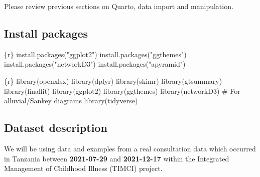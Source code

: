 \documentclass[
  letterpaper,
  DIV=11,
  numbers=noendperiod,
  oneside]{scrreprt}
\newenvironment{Shaded}{\begin{snugshade}}{\end{snugshade}}
\newcommand{\CommentTok}[1]{\textcolor[rgb]{0.37,0.37,0.37}{#1}}
\newcommand{\FunctionTok}[1]{\textcolor[rgb]{0.28,0.35,0.67}{#1}}
\newcommand{\InformationTok}[1]{\textcolor[rgb]{0.37,0.37,0.37}{#1}}
\newcommand{\NormalTok}[1]{\textcolor[rgb]{0.00,0.23,0.31}{#1}}
\newcommand{\StringTok}[1]{\textcolor[rgb]{0.13,0.47,0.30}{#1}}
\begin{document}
Please review previous sections on Quarto, data import and manipulation.

\hypertarget{install-packages}{%
\subsection{Install packages}\label{install-packages}}

\begin{Shaded}
\begin{Highlighting}[]
\InformationTok{\textasciigrave{}\textasciigrave{}\textasciigrave{}\{r\}}
\FunctionTok{install.packages}\NormalTok{(}\StringTok{"ggplot2"}\NormalTok{)}
\FunctionTok{install.packages}\NormalTok{(}\StringTok{"ggthemes"}\NormalTok{)}
\FunctionTok{install.packages}\NormalTok{(}\StringTok{"networkD3"}\NormalTok{)}
\FunctionTok{install.packages}\NormalTok{(}\StringTok{"apyramid"}\NormalTok{)}
\InformationTok{\textasciigrave{}\textasciigrave{}\textasciigrave{}}
\end{Highlighting}
\end{Shaded}

\begin{Shaded}
\begin{Highlighting}[]
\InformationTok{\textasciigrave{}\textasciigrave{}\textasciigrave{}\{r\}}
\FunctionTok{library}\NormalTok{(openxlsx)}
\FunctionTok{library}\NormalTok{(dplyr)}
\FunctionTok{library}\NormalTok{(skimr)}
\FunctionTok{library}\NormalTok{(gtsummary)}
\FunctionTok{library}\NormalTok{(finalfit)}
\FunctionTok{library}\NormalTok{(ggplot2)}
\FunctionTok{library}\NormalTok{(ggthemes)}
\FunctionTok{library}\NormalTok{(networkD3) }\CommentTok{\# For alluvial/Sankey diagrams}
\FunctionTok{library}\NormalTok{(tidyverse)}
\InformationTok{\textasciigrave{}\textasciigrave{}\textasciigrave{}}
\end{Highlighting}
\end{Shaded}

\hypertarget{dataset-description}{%
\subsection{Dataset description}\label{dataset-description}}

We will be using data and examples from a real consultation data which
occurred in Tanzania between \textbf{2021-07-29} and \textbf{2021-12-17}
within the Integrated Management of Childhood Illness (TIMCI) project.
\end{document}
